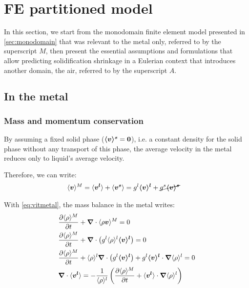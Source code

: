 
\section{FE partitioned model}
 
In this section, we start from the monodomain finite element model 
presented in \cref{sec:monodomain} that was relevant to the metal only, 
referred to by the superscript $M$, then present the essential assumptions and formulations 
that allow predicting solidification shrinkage in a Eulerian context that introduces
another domain, the air, referred to by the superscript $A$.

\subsection{In the metal}

\subsubsection{Mass and momentum conservation}

By assuming a fixed solid phase ($\boldsymbol{\langle v \rangle^s}=\boldsymbol{0}$), i.e. a constant density 
for the solid phase without any transport of this phase, 
the average velocity in the metal reduces only to liquid's average velocity. 

Therefore, we can write:
\begin{align}
\label{eq:vitmetal}
& \langle \boldsymbol{v} \rangle^M = \langle \boldsymbol{v^l} \rangle + \langle \boldsymbol{v^s} \rangle = {g^l} \boldsymbol{\langle v \rangle^l} + \cancel{{g^s} \boldsymbol{\langle v \rangle^s}}
\end{align}

With \cref{eq:vitmetal}, the mass balance in the metal writes:
\begin{subequations}
\begin{align}
& \frac{\partial \langle \rho \rangle^M}{\partial t}  + \boldsymbol{\nabla} \cdot \langle \rho \boldsymbol{v} \rangle^M  = 0 \\ 
& \frac{\partial \langle \rho \rangle^M}{\partial t}  + \boldsymbol{\nabla} \cdot \left(  {g^l} \langle \rho \rangle^l \boldsymbol{\langle v \rangle^l} \right) = 0 \\ 
& \frac{\partial \langle \rho \rangle^M}{\partial t}  + \langle \rho \rangle^l \boldsymbol{\nabla} \cdot \left(  {g^l} \boldsymbol{\langle v \rangle^l} \right) 
	+ {g^l} \boldsymbol{\langle v \rangle^l} \cdot  \boldsymbol{\nabla} \langle \rho \rangle^l = 0 \\	
\label{eq:mass_balance_metal}
& \boldsymbol{\nabla} \cdot \langle \boldsymbol{v^l} \rangle 
= -\frac{1}{\langle \rho \rangle^l} \left( \frac{\partial \langle \rho \rangle^M }{\partial t} + \langle \boldsymbol{v^l} \rangle \cdot  \boldsymbol{\nabla} \langle \rho \rangle^l \right)
\end{align}
\end{subequations}

